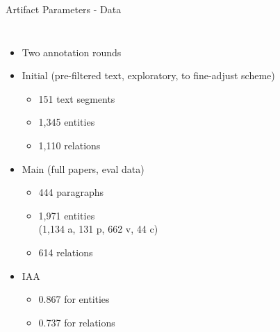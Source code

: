 \documentclass[en,16:9,smallfoot]{sdqbeamer}
\begin{document}
   \begin{frame}{Artifact Parameters - Data}
   \begin{columns}
           \begin{itemize}
               \item Two annotation rounds
               \item Initial (pre-filtered text, exploratory, to fine-adjust scheme)
               \begin{itemize}
                  \item 151 text segments
                  \item 1,345 entities
                  \item 1,110 relations
               \end{itemize}
               \item Main (full papers, eval data)
               \begin{itemize}
                  \item 444 paragraphs
                  \item 1,971 entities\\(1,134 a, 131 p, 662 v, 44 c)
                  \item 614 relations
               \end{itemize}
               \item IAA
               \begin{itemize}
                  \item 0.867 for entities
                  \item 0.737 for relations
               \end{itemize}
           \end{itemize}
            \begin{figure}
                \centering
\end{figure}
\end{columns}
\end{frame}
\end{document}
